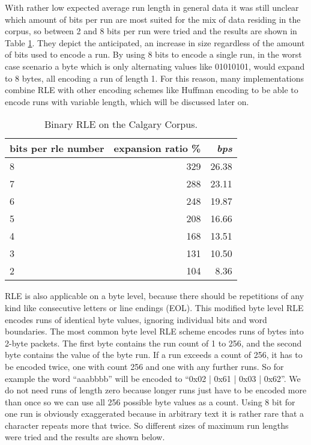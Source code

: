 \par{
	With rather low expected average run length in general data it was still unclear which amount of bits per run are most suited for the mix of data residing in the corpus, so between 2 and 8 bits per run were tried and the results are shown in Table \ref{tab:t30 Binary RLE on the Calgary Corpus}. They depict the anticipated, an increase in size regardless of the amount of bits used to encode a run. By using 8 bits to encode a single run, in the worst case scenario a byte which is only alternating values like 01010101, would expand to 8 bytes, all encoding a run of length 1. For this reason, many implementations combine RLE with other encoding schemes like Huffman encoding to be able to encode runs with variable length, which will be discussed later on.
}

\begin{table}[h]
	\centering
	\begin{tabular}{l|r|r}
		bits per rle number &  expansion ratio \% & \textit{bps}\\
		\hline
		8 & 329 & 26.38\\
		7 & 288 & 23.11\\
		6 & 248 & 19.87\\
		5 & 208 & 16.66\\
		4 & 168 & 13.51\\
		3 & 131 & 10.50\\
		2 & 104 & 8.36\\
	\end{tabular}
	\caption{Binary RLE on the Calgary Corpus.}
	\label{tab:t30 Binary RLE on the Calgary Corpus}
\end{table}

\par{
RLE is also applicable on a byte level, because there should be repetitions of any kind like consecutive letters or line endings (EOL). This modified byte level RLE encodes runs of identical byte values, ignoring individual bits and word boundaries. The most common byte level RLE scheme encodes runs of bytes into 2-byte packets. The first byte contains the run count of 1 to 256, and the second byte contains the value of the byte run. If a run exceeds a count of 256, it has to be encoded twice, one with count 256 and one with any further runs. So for example the word \enquote{aaabbbb} will be encoded to \enquote{0x02 | 0x61 | 0x03 | 0x62}. We do not need runs of length zero because longer runs just have to be encoded more than once so we can use all 256 possible byte values as a count. Using 8 bit for one run is obviously exaggerated because in arbitrary text it is rather rare that a character repeats more that twice. So different sizes of maximum run lengths were tried and the results are shown below.
}

